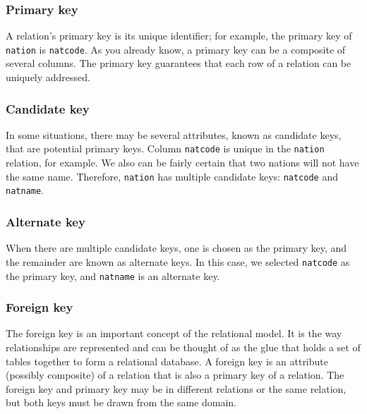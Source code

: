 \documentclass[
]{article}
\begin{document}
\hypertarget{primary-key}{%
\subsubsection*{Primary key}\label{primary-key}}

A relation's primary key is its unique identifier; for example, the
primary key of \texttt{nation} is \texttt{natcode}. As you already know, a primary key
can be a composite of several columns. The primary key guarantees that
each row of a relation can be uniquely addressed.

\hypertarget{candidate-key}{%
\subsubsection*{Candidate key}\label{candidate-key}}

In some situations, there may be several attributes, known as candidate
keys, that are potential primary keys. Column \texttt{natcode} is unique in the
\texttt{nation} relation, for example. We also can be fairly certain that two
nations will not have the same name. Therefore, \texttt{nation} has multiple
candidate keys: \texttt{natcode} and \texttt{natname}.

\hypertarget{alternate-key}{%
\subsubsection*{Alternate key}\label{alternate-key}}

When there are multiple candidate keys, one is chosen as the primary
key, and the remainder are known as alternate keys. In this case, we
selected \texttt{natcode} as the primary key, and \texttt{natname} is an alternate
key.

\hypertarget{foreign-key}{%
\subsubsection*{Foreign key}\label{foreign-key}}

The foreign key is an important concept of the relational model. It is
the way relationships are represented and can be thought of as the glue
that holds a set of tables together to form a relational database. A
foreign key is an attribute (possibly composite) of a relation that is
also a primary key of a relation. The foreign key and primary key may be
in different relations or the same relation, but both keys must be drawn
from the same domain.
\end{document}
